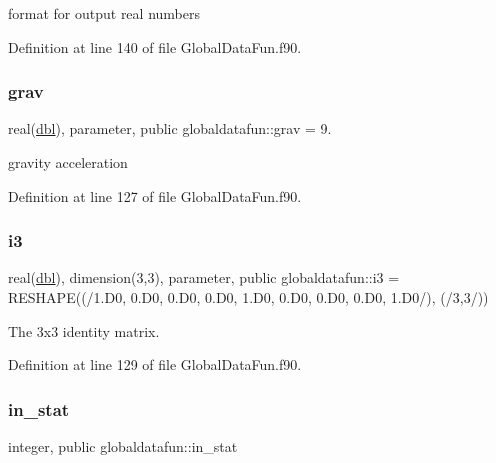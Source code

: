 format for output real numbers 



Definition at line 140 of file Global\+Data\+Fun.\+f90.

\mbox{\label{namespaceglobaldatafun_a6ddc394879657b50856a10648f3af6bd}} 
\subsubsection{\texorpdfstring{grav}{grav}}
{\footnotesize\ttfamily real(\hyperlink{namespaceglobaldatafun_a5008801201dd34f2af8eae07756befb4}{dbl}), parameter, public globaldatafun\+::grav = 9.}



gravity acceleration 



Definition at line 127 of file Global\+Data\+Fun.\+f90.

\mbox{\label{namespaceglobaldatafun_abe3df2088f071e903ebdcf4734f6dc27}} 
\subsubsection{\texorpdfstring{i3}{i3}}
{\footnotesize\ttfamily real(\hyperlink{namespaceglobaldatafun_a5008801201dd34f2af8eae07756befb4}{dbl}), dimension(3,3), parameter, public globaldatafun\+::i3 = R\+E\+S\+H\+A\+PE((/1.D0, 0.D0, 0.D0, 0.D0, 1.D0, 0.D0, 0.D0, 0.D0, 1.D0/), (/3,3/))}



The 3x3 identity matrix. 



Definition at line 129 of file Global\+Data\+Fun.\+f90.

\mbox{\label{namespaceglobaldatafun_a64c0718f56f06c9fe3cfb49b0dc5ced0}} 
\subsubsection{\texorpdfstring{in\+\_\+stat}{in\_stat}}
{\footnotesize\ttfamily integer, public globaldatafun\+::in\+\_\+stat}



